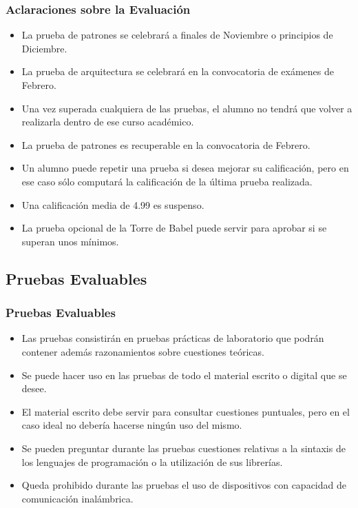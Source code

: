 \documentclass[animated,a4paper,slidestop,xcolor=pst,blue]{beamer}
\begin{document}
\begin{frame}[c]
	\frametitle{Aclaraciones sobre la Evaluación}
	\begin{itemize}
        \item<2-> La prueba de patrones se celebrará a finales de Noviembre o principios de Diciembre.
        \item<3-> La prueba de arquitectura se celebrará en la convocatoria de exámenes de Febrero.
        \item<5-> Una vez superada cualquiera de las pruebas, el alumno no tendrá que volver a realizarla dentro de ese curso académico.
        \item<5-> La prueba de patrones es recuperable en la convocatoria de Febrero.
        \item<6-> Un alumno puede repetir una prueba si desea mejorar su calificación, pero en ese caso sólo computará la calificación de la última prueba realizada.
		\item<7-> Una calificación media de 4.99 es suspenso.
        \item<8-> La prueba opcional de la Torre de Babel puede servir para aprobar si se superan unos mínimos.
	\end{itemize}
\end{frame}

\subsection{Pruebas Evaluables}

\begin{frame}[c]
    \frametitle{Pruebas Evaluables}
	\begin{itemize}[<+->]
	   \item Las pruebas consistirán en pruebas prácticas de laboratorio que podrán contener además razonamientos sobre cuestiones teóricas.
       \item Se puede hacer uso en las pruebas de todo el material escrito o digital que se desee.
       \item El material escrito debe servir para consultar cuestiones puntuales, pero en el caso ideal no debería hacerse ningún uso del mismo.
       \item Se pueden preguntar durante las pruebas cuestiones relativas a la sintaxis de los lenguajes de programación o la utilización de sus librerías.
       \item Queda prohibido durante las pruebas el uso de dispositivos con capacidad de comunicación inalámbrica.
	\end{itemize}
\end{frame}
\end{document}

